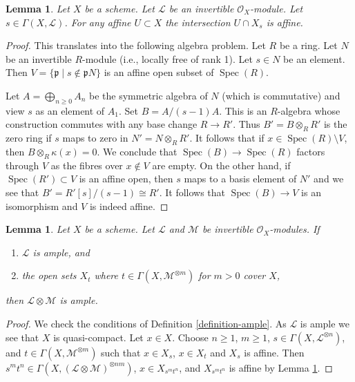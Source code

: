\documentclass{stacks-project}
\newenvironment{reference}{\comment}{\endcomment}
\theoremstyle{plain}
\newtheorem{lemma}[subsection]{Lemma}
\theoremstyle{definition}
\theoremstyle{remark}
\numberwithin{equation}{subsection}
\def\Spec{\mathop{\mathrm{Spec}}}
\begin{document}
\begin{lemma}
\label{lemma-affine-cap-s-open}
Let $X$ be a scheme. Let $\mathcal{L}$ be an invertible $\mathcal{O}_X$-module.
Let $s \in \Gamma(X, \mathcal{L})$. For any affine $U \subset X$
the intersection $U \cap X_s$ is affine.
\end{lemma}

\begin{proof}
This translates into the following algebra problem.
Let $R$ be a ring. Let $N$ be an invertible $R$-module
(i.e., locally free of rank 1). Let $s \in N$ be an element.
Then $V = \{\mathfrak p \mid s \not \in \mathfrak p N\}$ is
an affine open subset of $\Spec(R)$.

\medskip\noindent
Let $A = \bigoplus_{n \geq 0} A_n$ be the symmetric algebra of $N$
(which is commutative) and view $s$ as an element of $A_1$.
Set $B = A/(s - 1)A$. This is an $R$-algebra whose construction
commutes with any base change $R \to R'$. Thus $B' = B \otimes_R R'$
is the zero ring if $s$ maps to zero in $N' = N \otimes_R R'$. It
follows that if $x \in \Spec(R) \setminus V$, then $B \otimes_R \kappa(x) = 0$.
We conclude that $\Spec(B) \to \Spec(R)$ factors through $V$ as the
fibres over $x \not \in V$ are empty. On the other hand, if
$\Spec(R') \subset V$ is an affine open, then $s$ maps to a basis
element of $N'$ and we see that $B' = R'[s]/(s - 1) \cong R'$.
It follows that $\Spec(B) \to V$ is an isomorphism and $V$ is
indeed affine.
\end{proof}

\begin{lemma}
\label{lemma-ample-tensor-globally-generated}
\begin{reference}
\cite[II Proposition 4.5.6(ii)]{EGA}
\end{reference}
Let $X$ be a scheme. Let $\mathcal{L}$ and $\mathcal{M}$
be invertible $\mathcal{O}_X$-modules. If
\begin{enumerate}
\item $\mathcal{L}$ is ample, and
\item the open sets $X_t$ where $t \in \Gamma(X, \mathcal{M}^{\otimes m})$
for $m > 0$ cover $X$,
\end{enumerate}
then $\mathcal{L} \otimes \mathcal{M}$ is ample.
\end{lemma}

\begin{proof}
We check the conditions of Definition \ref{definition-ample}.
As $\mathcal{L}$ is ample we see that $X$ is quasi-compact.
Let $x \in X$. Choose $n \geq 1$, $m \geq 1$,
$s \in \Gamma(X, \mathcal{L}^{\otimes n})$, and
$t \in \Gamma(X, \mathcal{M}^{\otimes m})$
such that $x \in X_s$, $x \in X_t$ and $X_s$ is affine.
Then $s^mt^n \in \Gamma(X, (\mathcal{L} \otimes \mathcal{M})^{\otimes nm})$,
$x \in X_{s^mt^n}$, and $X_{s^mt^n}$ is affine by
Lemma \ref{lemma-affine-cap-s-open}.
\end{proof}
\end{document}
